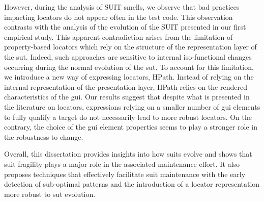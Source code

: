 However, during the analysis of SUIT smells, we observe that bad practices impacting locators do not appear often in the test code. This observation contrasts with the analysis of the evolution of the SUIT presented in our first empirical study.  This apparent contradiction arises from the limitation of property-based locators which rely on the structure of the representation layer of the \gls{sut}. Indeed, such approaches are sensitive to internal iso-functional changes occurring during the normal evolution of the \gls{sut}. To account for this limitation, we introduce a new way of expressing locators, HPath. Instead of relying on the internal representation of the presentation layer, HPath relies on the rendered characteristics of the \gls{gui}. Our results suggest that despite what is presented in the literature on locators, expressions relying on a smaller number of \gls{gui} elements to fully qualify a target do not necessarily lead to more robust locators. On the contrary, the choice of the \gls{gui} element properties seems to play a stronger role in the robustness to change.

Overall, this dissertation provides insights into how \gls{suit}s evolve and shows that \gls{suit} fragility plays a major role in the associated maintenance effort. It also proposes techniques that effectively facilitate \gls{suit} maintenance with the early detection of sub-optimal patterns and the introduction of a locator representation more robust to \gls{sut} evolution.
